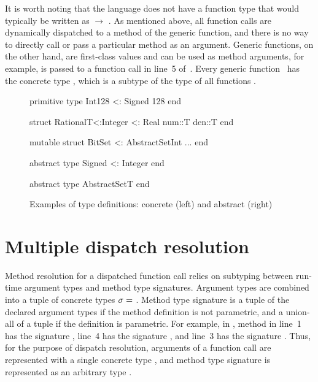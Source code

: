 It is worth noting that the language does not have a function type that would
typically be written as  $\rightarrow$ . As mentioned above,
all function calls are dynamically dispatched to a method of the generic
function, and there is no way to directly call or
pass a particular method as an argument.
Generic functions, on the other hand, are first-class values and can be used as
method arguments, for example, \cjl{(-)} is passed to a function call in line~5
of~.
Every generic function~ has the concrete type ,
which is a subtype of the type of all functions .

\begin{figure}[t] 
\begin{minipage}{5.5cm}
\begin{julia}
primitive type Int128 <: Signed 128
end

struct Rational{T<:Integer} <: Real
  num::T
  den::T
end

mutable struct
  BitSet <: AbstractSet{Int}
  ...
end
\end{julia}
\end{minipage}
\hspace{1.2cm}
\begin{minipage}{4.8cm}
\begin{julia}
abstract type Signed <: Integer
end

abstract type AbstractSet{T}
end
\end{julia}
\end{minipage}
\caption{Examples of type definitions:
  concrete (left) and abstract (right)}\label{fig:code:user-def-types}
\end{figure}


\section{Multiple dispatch resolution}\label{sec:2:dispatch}

Method resolution for a dispatched function call 
relies on subtyping between run-time argument types and method type signatures.
Argument types are combined into a tuple of concrete types
$\sigma =$ .
Method type signature is a tuple of the declared argument types
if the method definition is not parametric, and a union-all of a tuple
if the definition is parametric.
For example, in , method in line~1
has the signature , line~4 has the signature
, and line~3 has the signature
.
Thus, for the purpose of dispatch resolution, arguments of a function call
are represented with a single concrete type \gty,
and method type signature is represented as an arbitrary type \ty.


